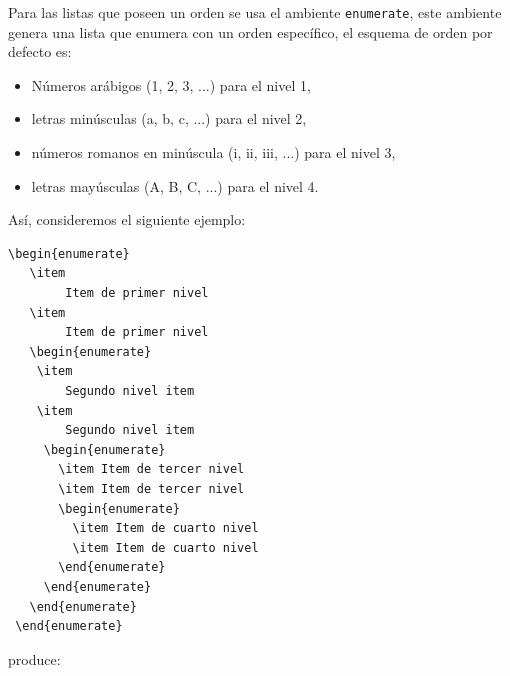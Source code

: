 \documentclass[a4,10pt]{aleph-notas}
\begin{document}
Para las listas que poseen un orden se usa el ambiente \verb"enumerate", este ambiente genera una lista que enumera con un orden específico, el esquema de orden por defecto es:

\begin{itemize}
    \item
        Números arábigos (1, 2, 3, ...) para el nivel 1,
    \item
        letras minúsculas (a, b, c, ...) para el nivel 2,
    \item
        números romanos en minúscula (i, ii, iii, ...) para el nivel 3,
    \item
        letras mayúsculas (A, B, C, ...) para el nivel 4. 
\end{itemize}

Así, consideremos el siguiente ejemplo:

\begin{lstlisting}[frame=single]
 \begin{enumerate}
   \item 
        Item de primer nivel
   \item
        Item de primer nivel
   \begin{enumerate}
    \item
        Segundo nivel item
    \item
        Segundo nivel item
     \begin{enumerate}
       \item Item de tercer nivel
       \item Item de tercer nivel
       \begin{enumerate}
         \item Item de cuarto nivel
         \item Item de cuarto nivel
       \end{enumerate}
     \end{enumerate}
   \end{enumerate}
 \end{enumerate}
\end{lstlisting}

produce:
\end{document}
